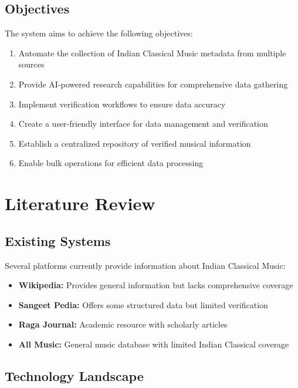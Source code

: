 \documentclass[12pt,a4paper]{article}
\begin{document}
\subsection{Objectives}

The system aims to achieve the following objectives:

\begin{enumerate}
    \item Automate the collection of Indian Classical Music metadata from multiple sources
    \item Provide AI-powered research capabilities for comprehensive data gathering
    \item Implement verification workflows to ensure data accuracy
    \item Create a user-friendly interface for data management and verification
    \item Establish a centralized repository of verified musical information
    \item Enable bulk operations for efficient data processing
\end{enumerate}

\section{Literature Review}

\subsection{Existing Systems}

Several platforms currently provide information about Indian Classical Music:

\begin{itemize}
    \item \textbf{Wikipedia:} Provides general information but lacks comprehensive coverage
    \item \textbf{Sangeet Pedia:} Offers some structured data but limited verification
    \item \textbf{Raga Journal:} Academic resource with scholarly articles
    \item \textbf{All Music:} General music database with limited Indian Classical coverage
\end{itemize}

\subsection{Technology Landscape}
\end{document}
